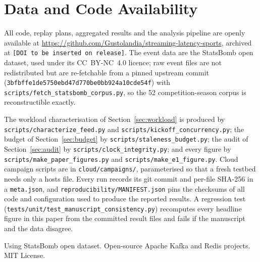 \documentclass[Afour,sageh,times]{sagej}
\begin{document}
\section*{Data and Code Availability}
All code, replay plans, aggregated results and the analysis pipeline are openly available at
\url{https://github.com/Gustolandia/streaming-latency-sports}, archived at
\texttt{[DOI to be inserted on release]}. The event data are the StatsBomb open dataset, used
under its CC~BY-NC~4.0 licence; raw event files are not redistributed but are re-fetchable from a
pinned upstream commit (\texttt{3bfbffe1de5750ebd47d770be0bb924a10cde54f}) with
\texttt{scripts/fetch\_statsbomb\_corpus.py}, so the 52 competition-season corpus is
reconstructible exactly.

The workload characterisation of Section~\ref{sec:workload} is produced by
\texttt{scripts/characterize\_feed.py} and \texttt{scripts/kickoff\_concurrency.py}; the budget of
Section~\ref{sec:budget} by \texttt{scripts/staleness\_budget.py}; the audit of
Section~\ref{sec:audit} by \texttt{scripts/clock\_integrity.py}; and every figure by
\texttt{scripts/make\_paper\_figures.py} and \texttt{scripts/make\_e1\_figure.py}. Cloud campaign
scripts are in \texttt{cloud/campaigns/}, parameterised so that a fresh testbed needs only a
hosts file. Every run records its git commit and per-file SHA-256 in a \texttt{meta.json}, and
\texttt{reproducibility/MANIFEST.json} pins the checksums of all code and configuration used to
produce the reported results. A regression test
(\texttt{tests/unit/test\_manuscript\_consistency.py}) recomputes every headline figure in this
paper from the committed result files and fails if the manuscript and the data disagree.

\begin{acks}
Using StatsBomb open dataset. Open-source Apache Kafka and Redis projects. MIT License.
\end{acks}



\end{document}
